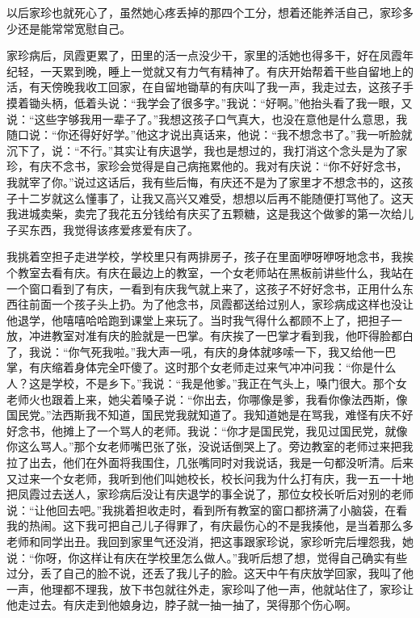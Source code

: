 \documentclass[12pt,UTF8]{ctexbook}
\begin{document}
以后家珍也就死心了，虽然她心疼丢掉的那四个工分，想着还能养活自己，家珍多少还是能常常宽慰自己。

家珍病后，凤霞更累了，田里的活一点没少干，家里的活她也得多干，好在凤霞年纪轻，一天累到晚，睡上一觉就又有力气有精神了。有庆开始帮着干些自留地上的活，有天傍晚我收工回家，在自留地锄草的有庆叫了我一声，我走过去，这孩子手摸着锄头柄，低着头说：“我学会了很多字。”我说：“好啊。”他抬头看了我一眼，又说：“这些字够我用一辈子了。”我想这孩子口气真大，也没在意他是什么意思，我随口说：“你还得好好学。”他这才说出真话来，他说：“我不想念书了。”我一听脸就沉下了，说：“不行。”其实让有庆退学，我也是想过的，我打消这个念头是为了家珍，有庆不念书，家珍会觉得是自己病拖累他的。我对有庆说：“你不好好念书，我就宰了你。”说过这话后，我有些后悔，有庆还不是为了家里才不想念书的，这孩子十二岁就这么懂事了，让我又高兴又难受，想想以后再不能随便打骂他了。这天我进城卖柴，卖完了我花五分钱给有庆买了五颗糖，这是我这个做爹的第一次给儿子买东西，我觉得该疼爱疼爱有庆了。

我挑着空担子走进学校，学校里只有两排房子，孩子在里面咿呀咿呀地念书，我挨个教室去看有庆。有庆在最边上的教室，一个女老师站在黑板前讲些什么，我站在一个窗口看到了有庆，一看到有庆我气就上来了，这孩子不好好念书，正用什么东西往前面一个孩子头上扔。为了他念书，凤霞都送给过别人，家珍病成这样也没让他退学，他嘻嘻哈哈跑到课堂上来玩了。当时我气得什么都顾不上了，把担子一放，冲进教室对准有庆的脸就是一巴掌。有庆挨了一巴掌才看到我，他吓得脸都白了，我说：“你气死我啦。”我大声一吼，有庆的身体就哆嗦一下，我又给他一巴掌，有庆缩着身体完全吓傻了。这时那个女老师走过来气冲冲问我：“你是什么人？这是学校，不是乡下。”我说：“我是他爹。”我正在气头上，嗓门很大。那个女老师火也跟着上来，她尖着嗓子说：“你出去，你哪像是爹，我看你像法西斯，像国民党。”法西斯我不知道，国民党我就知道了。我知道她是在骂我，难怪有庆不好好念书，他摊上了一个骂人的老师。我说：“你才是国民党，我见过国民党，就像你这么骂人。”那个女老师嘴巴张了张，没说话倒哭上了。旁边教室的老师过来把我拉了出去，他们在外面将我围住，几张嘴同时对我说话，我是一句都没听清。后来又过来一个女老师，我听到他们叫她校长，校长问我为什么打有庆，我一五一十地把凤霞过去送人，家珍病后没让有庆退学的事全说了，那位女校长听后对别的老师说：“让他回去吧。”我挑着担收走时，看到所有教室的窗口都挤满了小脑袋，在看我的热闹。这下我可把自己儿子得罪了，有庆最伤心的不是我揍他，是当着那么多老师和同学出丑。我回到家里气还没消，把这事跟家珍说，家珍听完后埋怨我，她说：“你呀，你这样让有庆在学校里怎么做人。”我听后想了想，觉得自己确实有些过分，丢了自己的脸不说，还丢了我儿子的脸。这天中午有庆放学回家，我叫了他一声，他理都不理我，放下书包就往外走，家珍叫了他一声，他就站住了，家珍让他走过去。有庆走到他娘身边，脖子就一抽一抽了，哭得那个伤心啊。
\end{document}

